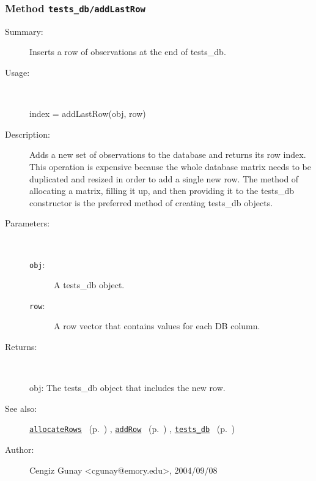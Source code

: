 \subsubsection[Method \texttt{addLastRow}]{Method \texttt{tests\_db/addLastRow}}%
%
\label{ref_tests_db__addLastRow}%
\hypertarget{ref_tests_db__addLastRow}{}%
\begin{description}
\item[Summary:]Inserts a row of observations at the end of tests\_db.
%
\item[Usage:]~%
\begin{lyxcode}%
index = addLastRow(obj, row)
%
\end{lyxcode}%
%
\item[Description:]%
Adds a new set of observations to the database and returns its row index.
   This operation is expensive because the whole 
   database matrix needs to be duplicated and resized in order to add a 
   single new row. The method of allocating a matrix, filling it up, and
   then providing it to the tests\_db constructor is the preferred method 
   of creating tests\_db objects.
\item[Parameters:]~
\begin{description}%
\item[\texttt{obj}:]
 A tests\_db object.
\item[\texttt{row}:]
 A row vector that contains values for each DB column.
\end{description}%
%
\item[Returns:]~

	obj: The tests\_db object that includes the new row.
%
%
\item[See also:]%
\hyperlink{ref_allocateRows}{\texttt{allocateRows}}%
\ (p.~\pageref{ref_allocateRows})%
%
, \hyperlink{ref_addRow}{\texttt{addRow}}%
\ (p.~\pageref{ref_addRow})%
%
, \hyperlink{ref_tests_db}{\texttt{tests\_db}}%
\ (p.~\pageref{ref_tests_db})%
%
%
\item[Author:]%
Cengiz Gunay <cgunay@emory.edu>, 2004/09/08%
\end{description}
\methodline%
